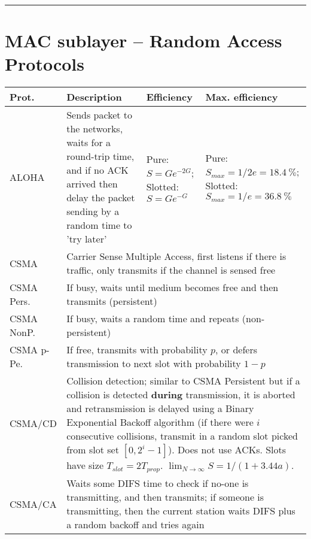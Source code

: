 \documentclass{form}
\begin{document}
\vspace{-0.5em}\noindent\rule{\textwidth}{1.0pt}\vspace{-1.5em}

\section*{MAC sublayer -- Random Access Protocols}
\begin{center}
    \begin{tabular}{@{}p{21mm} | p{85mm} | p{30mm} | p{46mm}@{}}
        \textbf{Prot.} & \textbf{Description}                                                                                                                           & \textbf{Efficiency}                      & \textbf{Max. efficiency}                                                             \\ \hline
        ALOHA          & Sends packet to the networks, waits for a round-trip time, and if no ACK arrived then delay the packet sending by a random time to 'try later' & Pure: $S=Ge^{-2G}$; Slotted: $S=Ge^{-G}$ & Pure: $S_{max}=1/2e=\SI{18.4}{\percent}$; Slotted: $S_{max}=1/e=\SI{36.8}{\percent}$ \\
        CSMA           & \multicolumn{3}{p{170mm}}{Carrier Sense Multiple Access, first listens if there is traffic, only transmits if the channel is sensed free            } \\
        CSMA Pers.     & \multicolumn{3}{p{170mm}}{If busy, waits until medium becomes free and then transmits (persistent)                                                  } \\
        CSMA NonP.     & \multicolumn{3}{p{170mm}}{If busy, waits a random time and repeats (non-persistent)                                                                 } \\
        CSMA p-Pe.     & \multicolumn{3}{p{170mm}}{If free, transmits with probability $p$, or defers transmission to next slot with probability $1-p$                       } \\
        CSMA/CD        & \multicolumn{3}{p{170mm}}{Collision detection; similar to CSMA Persistent but if a collision is detected \textbf{during} transmission, it is aborted and retransmission is delayed using a Binary Exponential Backoff algorithm (if there were $i$ consecutive collisions, transmit in a random slot picked from slot set $[0, 2^i-1]$). Does not use ACKs. Slots have size $T_{slot}=2T_{prop}$. $\lim_{N \rightarrow\infty}{S}=1/(1+3.44a)$.} \\
        CSMA/CA        & \multicolumn{3}{p{170mm}}{Waits some DIFS time to check if no-one is transmitting, and then transmits; if someone is transmitting, then the current station waits DIFS plus a random backoff and tries again} \\
    \end{tabular}
\end{center}
\end{document}
